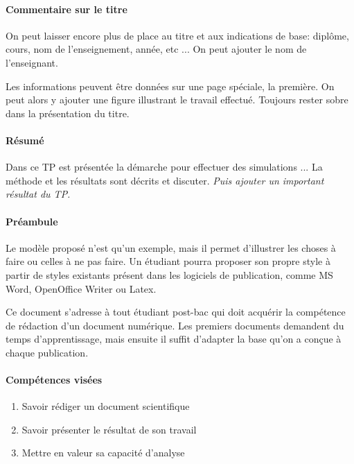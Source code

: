 



\paragraph{Commentaire sur le titre}
On peut laisser encore plus de place au titre et aux indications de base: diplôme, cours, nom de l'enseignement, année, etc ... On peut ajouter le nom de l'enseignant.

Les informations peuvent être données sur une page spéciale, la première. On peut alors y ajouter une figure illustrant le travail effectué. Toujours  rester sobre
dans la présentation du titre.

 


\paragraph{Résumé}
Dans ce TP est présentée la démarche pour effectuer des simulations ...
La méthode et les résultats sont décrits et discuter.
\textit{Puis ajouter un important résultat du TP.}



\paragraph{Préambule}
Le modèle proposé n'est qu'un exemple, mais il permet d'illustrer les choses à faire ou celles à ne pas faire. Un étudiant pourra proposer son propre style
à partir de styles existants présent dans les logiciels de publication, comme
MS Word, OpenOffice Writer ou Latex.

Ce document s'adresse à tout étudiant post-bac qui doit acquérir la compétence de rédaction d'un document numérique. Les premiers documents demandent du temps d'apprentissage, mais ensuite il suffit d'adapter la base qu'on a conçue à chaque publication.



\paragraph{Compétences visées}
\begin{enumerate}
\item Savoir rédiger un document scientifique
\item Savoir présenter le résultat de son travail
\item Mettre en valeur sa capacité d'analyse
\end{enumerate}

